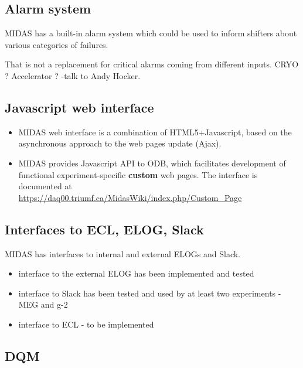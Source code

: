 \subsection{Alarm system}

MIDAS has a built-in alarm system which could be used to inform shifters
about various categories of failures.

That is not a replacement for critical alarms coming from different inputs.
CRYO ? Accelerator ? -{\red talk to Andy Hocker.}


\subsection{Javascript web interface}

\begin{itemize}
\item 
  MIDAS web interface is a combination of HTML5+Javascript, based on the
  asynchronous approach to the web pages update (Ajax).
\item 
  MIDAS provides Javascript API to ODB, which facilitates development of
  functional experiment-specific {\bf custom} web pages.
  The interface is documented at \\
  \href{https://daq00.triumf.ca/MidasWiki/index.php/Custom\_Page}
  {\blue https://daq00.triumf.ca/MidasWiki/index.php/Custom\_Page}
\end{itemize}


\subsection{Interfaces to ECL, ELOG, Slack}

MIDAS has interfaces to internal and external ELOGs and Slack.
\begin{itemize}
\item
  interface to the external ELOG has been implemented and tested
\item
  interface to Slack has been tested and used by at least two experiments - MEG and g-2
\item
  interface to ECL - to be implemented
\end{itemize}


\subsection{DQM}

